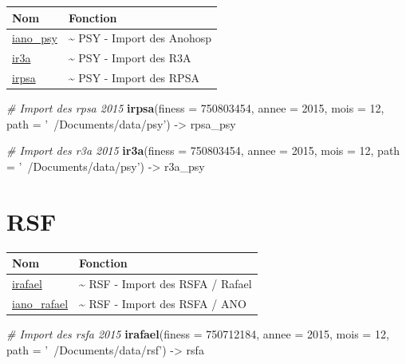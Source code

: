\documentclass[]{book}
\newenvironment{Shaded}{\begin{snugshade}}{\end{snugshade}}
\newcommand{\KeywordTok}[1]{\textcolor[rgb]{0.13,0.29,0.53}{\textbf{{#1}}}}
\newcommand{\DataTypeTok}[1]{\textcolor[rgb]{0.13,0.29,0.53}{{#1}}}
\newcommand{\DecValTok}[1]{\textcolor[rgb]{0.00,0.00,0.81}{{#1}}}
\newcommand{\StringTok}[1]{\textcolor[rgb]{0.31,0.60,0.02}{{#1}}}
\newcommand{\CommentTok}[1]{\textcolor[rgb]{0.56,0.35,0.01}{\textit{{#1}}}}
\newcommand{\NormalTok}[1]{{#1}}
\begin{document}
\begin{longtable}[]{@{}ll@{}}
\toprule
Nom & Fonction\tabularnewline
\midrule
\endhead
\href{https://github.com/IM-APHP/pmeasyr/tree/master/Rd_md/iano_psy.Rmd}{iano\_psy}
& \textasciitilde{} PSY - Import des Anohosp\tabularnewline
\href{https://github.com/IM-APHP/pmeasyr/tree/master/Rd_md/ir3a.Rmd}{ir3a}
& \textasciitilde{} PSY - Import des R3A\tabularnewline
\href{https://github.com/IM-APHP/pmeasyr/tree/master/Rd_md/irpsa.Rmd}{irpsa}
& \textasciitilde{} PSY - Import des RPSA\tabularnewline
\bottomrule
\end{longtable}

\begin{Shaded}
\begin{Highlighting}[]
\CommentTok{# Import des rpsa 2015}
\KeywordTok{irpsa}\NormalTok{(}\DataTypeTok{finess =} \DecValTok{750803454}\NormalTok{,}
      \DataTypeTok{annee =} \DecValTok{2015}\NormalTok{,}
      \DataTypeTok{mois =} \DecValTok{12}\NormalTok{,}
      \DataTypeTok{path =} \StringTok{'~/Documents/data/psy'}\NormalTok{) ->}\StringTok{ }\NormalTok{rpsa_psy}

\CommentTok{# Import des r3a 2015}
\KeywordTok{ir3a}\NormalTok{(}\DataTypeTok{finess =} \DecValTok{750803454}\NormalTok{,}
      \DataTypeTok{annee =} \DecValTok{2015}\NormalTok{,}
      \DataTypeTok{mois =} \DecValTok{12}\NormalTok{,}
      \DataTypeTok{path =} \StringTok{'~/Documents/data/psy'}\NormalTok{) ->}\StringTok{ }\NormalTok{r3a_psy}
\end{Highlighting}
\end{Shaded}

\section{RSF}\label{rsf}

\begin{longtable}[]{@{}ll@{}}
\toprule
Nom & Fonction\tabularnewline
\midrule
\endhead
\href{https://github.com/IM-APHP/pmeasyr/tree/master/Rd_md/irafael.Rmd}{irafael}
& \textasciitilde{} RSF - Import des RSFA / Rafael\tabularnewline
\href{https://github.com/IM-APHP/pmeasyr/tree/master/Rd_md/iano_rafael.Rmd}{iano\_rafael}
& \textasciitilde{} RSF - Import des RSFA / ANO\tabularnewline
\bottomrule
\end{longtable}

\begin{Shaded}
\begin{Highlighting}[]
\CommentTok{# Import des rsfa 2015}
\KeywordTok{irafael}\NormalTok{(}\DataTypeTok{finess =} \DecValTok{750712184}\NormalTok{,}
        \DataTypeTok{annee =} \DecValTok{2015}\NormalTok{,}
        \DataTypeTok{mois =} \DecValTok{12}\NormalTok{,}
        \DataTypeTok{path =} \StringTok{'~/Documents/data/rsf'}\NormalTok{) ->}\StringTok{ }\NormalTok{rsfa}
\end{Highlighting}
\end{Shaded}
\end{document}

